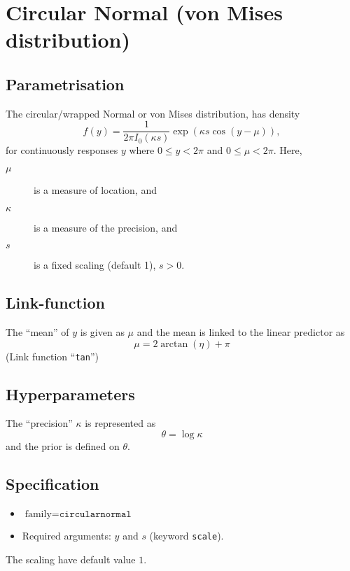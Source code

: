 \documentclass[a4paper,11pt]{article}
\begin{document}
\section*{Circular Normal (von Mises distribution)}

\subsection*{Parametrisation}

The circular/wrapped Normal or von Mises distribution, has density
\begin{displaymath}
    f(y) = \frac{1}{2\pi  I_{0}(\kappa s)} \exp(\kappa s \cos(y-\mu)), 
\end{displaymath}
for continuously responses $y$ where
$0\le y < 2\pi$ and $0 \le \mu < 2\pi$. Here, 
\begin{description}
\item[$\mu$] is a measure of location, and 
\item[$\kappa$] is a measure of the precision, and
\item[$s$] is a fixed scaling (default 1), $s>0$.
\end{description}

\subsection*{Link-function}

The ``mean'' of $y$ is given as $\mu$ and the mean is linked to the
linear predictor as
\begin{displaymath}
    \mu = 2\arctan(\eta) + \pi
\end{displaymath}
(Link function ``\texttt{tan}'')

\subsection*{Hyperparameters}

The ``precision'' $\kappa$ is represented as
\begin{displaymath}
    \theta = \log \kappa
\end{displaymath}
and the prior is defined on $\theta$. 

\subsection*{Specification}

\begin{itemize}
\item $\text{family}=\texttt{circularnormal}$
\item Required arguments: $y$ and $s$ (keyword \texttt{scale}).
\end{itemize}
The scaling have default value $1$. 
\end{document}
